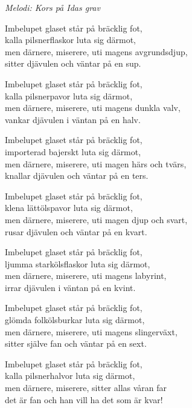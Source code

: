 {\footnotesize\textit{Melodi: Kors på Idas grav}}\par
\vspace{10pt}
Imbelupet glaset står på bräcklig fot,\\
kalla pilsnerflaskor luta sig därmot,\\
men därnere, miserere, uti magens avgrundsdjup,\\
sitter djävulen och väntar på en sup.\par
\vspace{10pt}
Imbelupet glaset står på bräcklig fot,\\
kalla pilsnerpavor luta sig därmot,\\
men därnere, miserere, uti magens dunkla valv,\\
vankar djävulen i väntan på en halv.\par
\vspace{10pt}
Imbelupet glaset står på bräcklig fot,\\
importerad bajerskt luta sig därmot,\\
men därnere, miserere, uti magen härs och tvärs,\\
knallar djävulen och väntar på en ters.\par
\vspace{10pt}
Imbelupet glaset står på bräcklig fot,\\
klena lättölspavor luta sig därmot,\\
men därnere, miserere, uti magen djup och svart,\\
rusar djävulen och väntar på en kvart.\par
\vspace{10pt}
Imbelupet glaset står på bräcklig fot,\\
ljumma starkölsflaskor luta sig därmot,\\
men därnere, miserere, uti magens labyrint,\\
irrar djävulen i väntan på en kvint.\par
\vspace{10pt}
Imbelupet glaset står på bräcklig fot,\\
glömda folkölsburkar luta sig därmot,\\
men därnere, miserere, uti magens slingerväxt,\\
sitter själve fan och väntar på en sext.\par
\vspace{10pt}
Imbelupet glaset står på bräcklig fot,\\
kalla pilsnerhalvor luta sig därmot,\\
men därnere, miserere, sitter allas våran far\\
det är fan och han vill ha det som är kvar!
